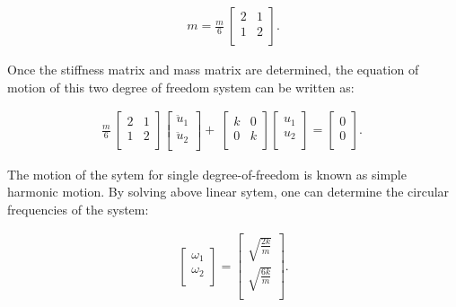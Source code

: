 \documentclass[paper=a4, fontsize=11pt]{scrartcl} %
\numberwithin{equation}{section} %
\numberwithin{figure}{section} %
\numberwithin{table}{section} %
\begin{document}
\begin{align}
  m=\frac{m}{6}\ \left[\begin{matrix}2&1\\1&2\\\end{matrix}\right].
\end{align}

Once the stiffness matrix and mass matrix are determined, the equation
of motion of this two degree of freedom system can be written as:

\begin{align}
\frac{m}{6}\
  \left[\begin{matrix}2&1\\1&2\\\end{matrix}\right]\left[\begin{matrix}{\ddot{u}}_1\\{\ddot{u}}_2\\\end{matrix}\right]+\
  \left[\begin{matrix}k&0\\0&k\\\end{matrix}\right]\left[\begin{matrix}u_1\\u_2\\\end{matrix}\right]=\left[\begin{matrix}0\\0\\\end{matrix}\right].\
\end{align}

The motion of the sytem for single degree-of-freedom is known as
simple harmonic motion. By solving above linear sytem, one can
determine the circular frequencies of the system:

\begin{align}
  \begin{bmatrix}\omega_1\\\omega_2\\\end{bmatrix} =
  \begin{bmatrix} \sqrt{\frac{2k}{m}} \\ \sqrt{\frac{6k}{m}} \\ \end{bmatrix}.
\end{align}
\end{document}
